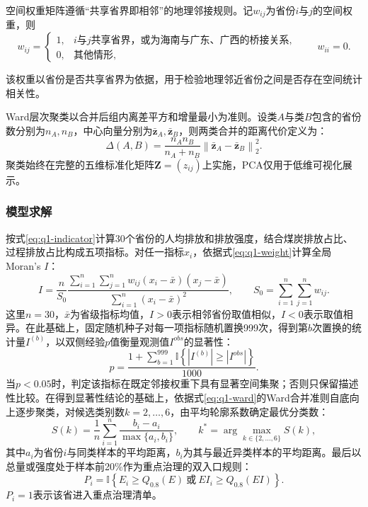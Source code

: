 \documentclass[12pt,a4paper]{ctexart}
\theoremstyle{definition}
\theoremstyle{plain}
\theoremstyle{remark}
\begin{document}
空间权重矩阵遵循“共享省界即相邻”的地理邻接规则。记$w_{ij}$为省份$i$与$j$的空间权重，则
\begin{equation}
w_{ij}=\begin{cases}
1,& i\text{与}j\text{共享省界，或为海南与广东、广西的桥接关系},\\
0,& \text{其他情形},
\end{cases}\qquad w_{ii}=0.
\label{eq:q1-weight}
\end{equation}

该权重以省份是否共享省界为依据，用于检验地理邻近省份之间是否存在空间统计相关性。

Ward层次聚类以合并后组内离差平方和增量最小为准则。设类$A$与类$B$包含的省份数分别为$n_A,n_B$，中心向量分别为$\bar{\bm z}_A,\bar{\bm z}_B$，则两类合并的距离代价定义为：
\begin{equation}
\Delta(A,B)=\frac{n_A n_B}{n_A+n_B}\left\|\bar{\bm z}_A-\bar{\bm z}_B\right\|_2^2.
\label{eq:q1-ward}
\end{equation}
聚类始终在完整的五维标准化矩阵$\bm Z=(z_{ij})$上实施，PCA仅用于低维可视化展示。

\subsubsection{模型求解}
按式\eqref{eq:q1-indicator}计算30个省份的人均排放和排放强度，结合煤炭排放占比、过程排放占比构成五项指标。对任一指标$x_i$，依据式\eqref{eq:q1-weight}计算全局Moran's $I$：
\begin{equation}
I=\frac{n}{S_0}\frac{\sum_{i=1}^{n}\sum_{j=1}^{n}w_{ij}(x_i-\bar{x})(x_j-\bar{x})}{\sum_{i=1}^{n}(x_i-\bar{x})^2},\qquad S_0=\sum_{i=1}^{n}\sum_{j=1}^{n}w_{ij}.
\label{eq:moran}
\end{equation}
这里$n=30$，$\bar{x}$为省级指标均值，$I>0$表示相邻省份取值相似，$I<0$表示取值相异。在此基础上，固定随机种子对每一项指标随机置换999次，得到第$b$次置换的统计量$I^{(b)}$，以双侧经验$p$值衡量观测值$I^{obs}$的显著性：
\begin{equation}
p=\frac{1+\sum_{b=1}^{999}\mathbb{I}\left\{\left|I^{(b)}\right|\geq\left|I^{obs}\right|\right\}}{1000}.
\label{eq:q1-permutation}
\end{equation}
当$p<0.05$时，判定该指标在既定邻接权重下具有显著空间集聚；否则只保留描述性比较。在得到显著性结论的基础上，依据式\eqref{eq:q1-ward}的Ward合并准则自底向上逐步聚类，对候选类别数$k=2,\ldots,6$，由平均轮廓系数确定最优分类数：
\begin{equation}
S(k)=\frac{1}{n}\sum_{i=1}^{n}\frac{b_i-a_i}{\max\{a_i,b_i\}},\qquad k^*=\arg\max_{k\in\{2,\ldots,6\}}S(k),
\label{eq:q1-silhouette}
\end{equation}
其中$a_i$为省份$i$与同类样本的平均距离，$b_i$为其与最近异类样本的平均距离。最后以总量或强度处于样本前20\%作为重点治理的双入口规则：
\begin{equation}
P_i=\mathbb{I}\left\{E_i\geq Q_{0.8}(E)\ \text{或}\ EI_i\geq Q_{0.8}(EI)\right\}.
\label{eq:priority}
\end{equation}
$P_i=1$表示该省进入重点治理清单。
\end{document}
